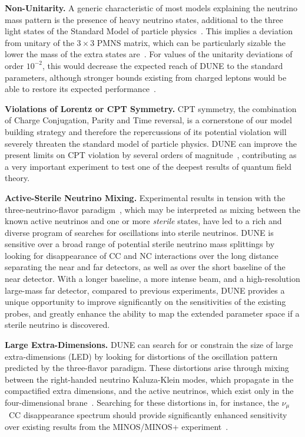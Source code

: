 {\bf Non-Unitarity.} 
A generic characteristic of most models explaining the neutrino mass
pattern is the presence of heavy neutrino states, additional to the
three light states of the Standard Model of particle
physics~\cite{Minkowski:1977sc,Mohapatra:1979ia,Yanagida:1979as,GellMann:1980vs}. This implies a deviation from unitary of the $3\times3$ PMNS matrix, which can be particularly sizable the lower the mass of the extra states are~\cite{Mohapatra:1986bd,Akhmedov:1995vm,Akhmedov:1995ip,Malinsky:2005bi}.
For values of the unitarity deviations of order $10^{-2}$, this would decrease the expected reach of DUNE to the standard parameters, although stronger bounds existing from charged leptons would be able to restore its expected performance~\cite{Blennow:2016jkn,Escrihuela:2016ube}.

{\bf Violations of Lorentz or CPT Symmetry.}
CPT symmetry, the combination of Charge Conjugation, Parity and Time reversal, is a cornerstone of our model building strategy and therefore the repercussions of its potential violation will severely threaten the standard model of particle physics. DUNE can improve the present limits on CPT violation by several orders of magnitude~\cite{Streater:1989vi,Barenboim:2002tz,Barenboim:2017ewj}, contributing
as a very important experiment to test one of the deepest results of quantum field theory.

{\bf Active-Sterile Neutrino Mixing.}
Experimental results in tension with the three-neutrino-flavor paradigm~\cite{LSNDSterile,Aguilar-Arevalo:2013pmq,Acero:2007su,Mention:2011rk}, which may be interpreted as mixing between the known active neutrinos and one or more {\it sterile} states, have led to a rich and diverse program of searches for oscillations into sterile neutrinos.
DUNE is sensitive over a broad range of potential sterile neutrino mass splittings by looking for disappearance of CC and NC interactions over the long distance separating the near and far detectors, as well as over the short baseline of the near detector. 
With a longer baseline, a more intense beam, and a high-resolution large-mass far detector, compared to previous experiments, DUNE provides a unique opportunity to improve significantly on the sensitivities of the existing probes, and greatly enhance the ability to map the extended parameter space if a sterile neutrino is discovered.

{\bf Large Extra-Dimensions.}
DUNE can search for or constrain the size of large extra-dimensions (LED) by looking for distortions of the oscillation pattern predicted by the three-flavor paradigm. These distortions arise through mixing between the right-handed neutrino Kaluza-Klein modes, which propagate in the compactified extra dimensions, and the active neutrinos, which exist only in the four-dimensional brane~\cite{Dvali:1999cn}. Searching for these distortions in, for instance, the $\nu_\mu$~CC disappearance spectrum should provide significantly enhanced sensitivity over existing results from the MINOS/MINOS+ experiment~\cite{Adamson:2016yvy}.

